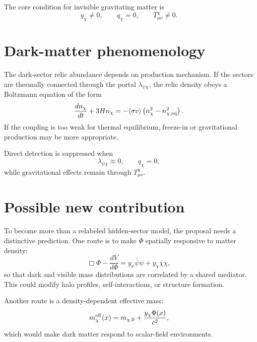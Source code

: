 \documentclass[11pt]{article}
\theoremstyle{remark}
\begin{document}
The core condition for invisible gravitating matter is
\begin{equation}
    y_\chi\neq 0,
    \qquad
    q_\chi=0,
    \qquad
    T^\chi_{\mu\nu}\neq 0.
\end{equation}

\section{Dark-matter phenomenology}
The dark-sector relic abundance depends on production mechanism. If the sectors are thermally connected through the portal $\lambda_{\psi\chi}$, the relic density obeys a Boltzmann equation of the form
\begin{equation}
    \frac{dn_\chi}{dt}+3Hn_\chi
    =-\langle\sigma v\rangle
    \left(n_\chi^2-n_{\chi,{\rm eq}}^2\right).
\end{equation}
If the coupling is too weak for thermal equilibrium, freeze-in or gravitational production may be more appropriate.

Direct detection is suppressed when
\begin{equation}
    \lambda_{\psi\chi}\approx 0,
    \qquad
    q_\chi=0,
\end{equation}
while gravitational effects remain through $T^\chi_{\mu\nu}$.

\section{Possible new contribution}
To become more than a relabeled hidden-sector model, the proposal needs a distinctive prediction. One route is to make $\Phi$ spatially responsive to matter density:
\begin{equation}
    \Box\Phi-\frac{dV}{d\Phi}=y_\psi\bar\psi\psi+y_\chi\bar\chi\chi,
\end{equation}
so that dark and visible mass distributions are correlated by a shared mediator. This could modify halo profiles, self-interactions, or structure formation.

Another route is a density-dependent effective mass:
\begin{equation}
    m_\chi^{\rm eff}(x)=m_{\chi,0}+\frac{y_\chi\Phi(x)}{c^2},
\end{equation}
which would make dark matter respond to scalar-field environments.
\end{document}
